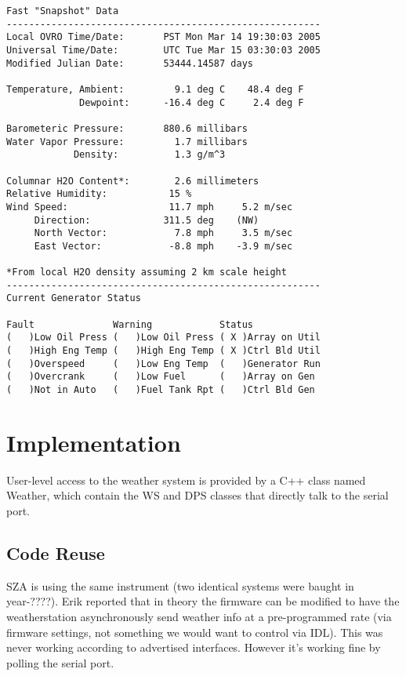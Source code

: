 \documentclass[11pt]{article}
\begin{document}
\footnotesize
\begin{verbatim}
Fast "Snapshot" Data
--------------------------------------------------------
Local OVRO Time/Date:       PST Mon Mar 14 19:30:03 2005
Universal Time/Date:        UTC Tue Mar 15 03:30:03 2005
Modified Julian Date:       53444.14587 days

Temperature, Ambient:         9.1 deg C    48.4 deg F
             Dewpoint:      -16.4 deg C     2.4 deg F

Barometeric Pressure:       880.6 millibars
Water Vapor Pressure:         1.7 millibars
            Density:          1.3 g/m^3

Columnar H2O Content*:        2.6 millimeters
Relative Humidity:           15 %
Wind Speed:                  11.7 mph     5.2 m/sec
     Direction:             311.5 deg    (NW)
     North Vector:            7.8 mph     3.5 m/sec
     East Vector:            -8.8 mph    -3.9 m/sec

*From local H2O density assuming 2 km scale height
--------------------------------------------------------
Current Generator Status

Fault              Warning            Status
(   )Low Oil Press (   )Low Oil Press ( X )Array on Util
(   )High Eng Temp (   )High Eng Temp ( X )Ctrl Bld Util
(   )Overspeed     (   )Low Eng Temp  (   )Generator Run
(   )Overcrank     (   )Low Fuel      (   )Array on Gen
(   )Not in Auto   (   )Fuel Tank Rpt (   )Ctrl Bld Gen
\end{verbatim}
\footnotesize

\section{Implementation}



User-level access to the weather system is provided by a C++ class named
Weather, which contain the WS and DPS classes that directly talk to the
serial port.

\subsection{Code Reuse}

SZA is using the same instrument (two identical systems were baught
in year-????). Erik reported that in theory the firmware can be modified
to have the weatherstation asynchronously send weather info at a
pre-programmed rate (via firmware settings, not something we would
want to control via IDL). This was never working according to
advertised interfaces. However it's working fine by polling the
serial port.
\end{document}
